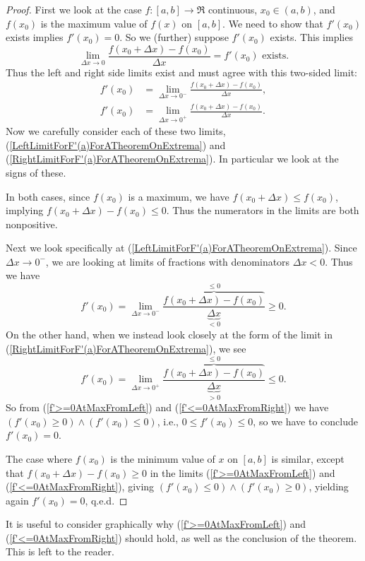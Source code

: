 \begin{proof}
First we look at the case $f:[a,b]\longrightarrow\Re$ 
continuous, $x_0\in(a,b)$,
and $f(x_0)$ is the maximum value of $f(x)$
on $[a,b]$.  We need to show that
$f'(x_0)$ exists implies $f'(x_0)=0$.  So we (further) 
suppose $f'(x_0)$ exists.  This implies
$$\lim_{\Delta x\to0}\frac{f(x_0+\Delta x)-f(x_0)}{\Delta x}=f'(x_0)
\text{ exists.}$$
Thus the left and right side limits exist and must agree with this
two-sided limit:
\begin{align}
f'(x_0)&=\lim_{\Delta x\to0^-}\frac{f(x_0+\Delta x)-f(x_0)}{\Delta x},
            \label{LeftLimitForF'(a)ForATheoremOnExtrema}\\
f'(x_0)&=\lim_{\Delta x\to0^+}\frac{f(x_0+\Delta x)-f(x_0)}{\Delta x}.
            \label{RightLimitForF'(a)ForATheoremOnExtrema}
\end{align}
Now we carefully consider each of these two limits,
(\ref{LeftLimitForF'(a)ForATheoremOnExtrema}) and 
(\ref{RightLimitForF'(a)ForATheoremOnExtrema}).  In particular 
we look at the signs of these.  

In both cases,  since
$f(x_0)$ is a maximum, we have $f(x_0+\Delta x)\le f(x_0)$,
implying $f(x_0+\Delta x)-f(x_0)\le0$.  Thus the numerators in the 
limits are both nonpositive.

Next we look specifically at (\ref{LeftLimitForF'(a)ForATheoremOnExtrema}).
Since $\Delta x\to0^-$, we are looking at limits of fractions
with denominators $\Delta x<0$.  Thus we have
\begin{equation}f'(x_0)=\lim_{\Delta x\to0^-}
  \frac{\overbrace{f(x_0+\Delta x)-f(x_0)}^{\le0}}
          {\underbrace{\Delta x}_{<0}}\ge0.\label{f'>=0AtMaxFromLeft}
\end{equation}
On the other hand, when we instead look closely at the form of the limit
in (\ref{RightLimitForF'(a)ForATheoremOnExtrema}), we see
\begin{equation}f'(x_0)=\lim_{\Delta x\to0^+}
  \frac{\overbrace{f(x_0+\Delta x)-f(x_0)}^{\le0}}
          {\underbrace{\Delta x}_{>0}}\le0.\label{f'<=0AtMaxFromRight}
\end{equation}
So from (\ref{f'>=0AtMaxFromLeft}) and
(\ref{f'<=0AtMaxFromRight})
we have $(f'(x_0)\ge0)\wedge(f'(x_0)\le0)$,
i.e., $0\le f'(x_0)\le0$, so we have to conclude $f'(x_0)=0$.

The case where $f(x_0)$ is the minimum value of $x$ on $[a,b]$ is similar,
except that $f(x_0+\Delta x)-f(x_0)\ge0$ in the limits
(\ref{f'>=0AtMaxFromLeft}) and (\ref{f'<=0AtMaxFromRight}), giving
$(f'(x_0)\le0)\wedge(f'(x_0)\ge0)$, yielding again $f'(x_0)=0$,
q.e.d.\footnotemark
\end{proof}
It is useful to consider graphically why 
(\ref{f'>=0AtMaxFromLeft}) and (\ref{f'<=0AtMaxFromRight}) should hold,
as well as the conclusion of the theorem.  This is left to
the reader.

